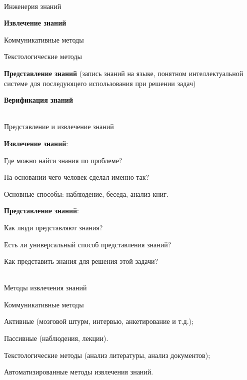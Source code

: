 \begin{frame}{\\Инженерия знаний}
	\topline
	\justifying
	
	\begin{textitemize}
		\item \textbf{Извлечение знаний}
		\begin{textitemize}
			\item Коммуникативные методы
			\item Текстологические методы
		\end{textitemize}
		\item \textbf{Представление знаний} (запись знаний на языке, понятном интеллектуальной системе для последующего использования при решении задач)
		
		\item \textbf{Верификация знаний}
	\end{textitemize}
	
\end{frame}

\begin{frame}{\\Представление и извлечение знаний}
	\topline
	\justifying
	
	\textbf{Извлечение знаний}:
	\begin{textitemize}
		\item Где можно найти знания по проблеме?
		\item На основании чего человек сделал именно так?
		\item Основные способы: наблюдение, беседа, анализ книг.
	\end{textitemize}	
	
	\textbf{Представление знаний}:
	\begin{textitemize}
		\item Как люди представляют знания?
		\item Есть ли универсальный способ представления знаний?
		\item Как представить знания для решения этой задачи?
	\end{textitemize}
	
\end{frame}

\begin{frame}{\\Методы извлечения знаний}
	\topline
	\justifying
	
	\begin{textitemize}
		\item Коммуникативные методы
		\begin{textitemize}
			\item Активные (мозговой штурм, интервью, анкетирование и т.д.);
			\item Пассивные (наблюдения, лекции).
		\end{textitemize}
		\item Текстологические методы (анализ литературы, анализ документов);
		\item Автоматизированные методы извлечения знаний.
	\end{textitemize}
	
\end{frame}

